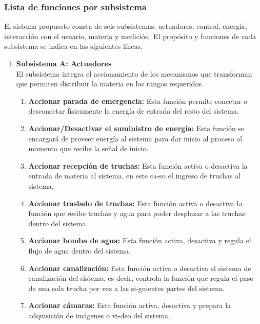 \newpage
\thispagestyle{fancy}
\subsubsection{Lista de funciones por subsistema}

El sistema propuesto consta de seis subsistemas: actuadores, control, energía, interacción con el usuario, materia y medición. El propósito y funciones de cada subsistema se indica en las siguientes líneas.

\begin{enumerate}
	
	\item \textbf{Subsistema A: Actuadores}\\ El subsistema integra el accionamiento de los mecanismos que transforman que permiten distribuir la materia en los rangos requeridos.
		
		\begin{enumerate}[label=\Alph*)] %
			\item	\textbf{Accionar parada de emergencia:} Esta función permite conectar o desconectar físicamente la energía de entrada del resto del sistema.
			
			\item	\textbf{Accionar/Desactivar el suministro de energía:} Esta función se encargará de proveer energía al sistema para dar inicio al proceso al momento que recibe la señal de inicio.
			
			\item	\textbf{Accionar recepción de truchas:}
			Esta función activa o desactiva la entrada de materia al sistema, en este ca-so el ingreso de truchas al sistema.
			
			\item	\textbf{Accionar traslado de truchas:}
			Esta función activa o desactiva la función que recibe truchas y agua para poder desplazar a las truchas dentro del sistema.
			
			\item	\textbf{Accionar bomba de agua:}
			Esta función activa, desactiva y regula el flujo de agua dentro del sistema. 
			
			\item	\textbf{Accionar canalización:}
			Esta función activa o desactiva el sistema de canalización del sistema, es decir, controla la función que regula el paso de una sola trucha por vez a las si-guientes partes del sistema.
			
			\item	\textbf{Accionar cámaras:}
			Esta función activa, desactiva y prepara la adquisición de imágenes o vi-deo del sistema.
			

\end{enumerate}
\end{enumerate}
